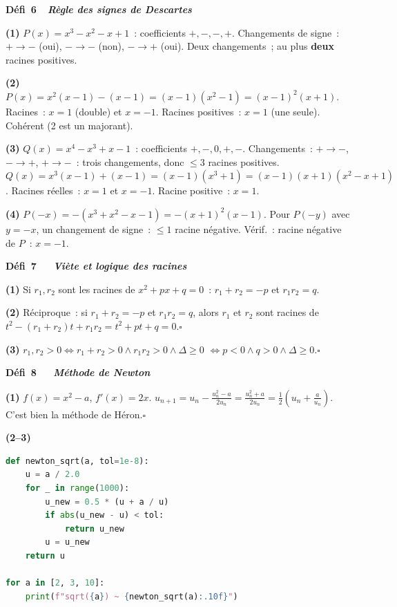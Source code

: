 \noindent{}
{\color{BO}\bfseries\small D\'efi~6~\textendash\ \textit{R\`egle des signes de Descartes}}
\par\smallskip

\textbf{(1)} $P(x)=x^3-x^2-x+1$~: coefficients $+,-,-,+$.
Changements de signe~: $+\to-$ (oui), $-\to-$ (non), $-\to+$ (oui).
Deux changements~; au plus \textbf{deux} racines positives.

\textbf{(2)} $P(x)=x^2(x-1)-(x-1)=(x-1)(x^2-1)=(x-1)^2(x+1)$.
Racines~: $x=1$ (double) et $x=-1$. Racines positives~: $x=1$ (une seule). Coh\'erent (2 est un majorant).\checkmark

\textbf{(3)} $Q(x)=x^4-x^3+x-1$~: coefficients $+,-,0,+,-$.
Changements~: $+\to-$, $-\to+$, $+\to-$~: trois changements, donc $\leq3$ racines positives.
$Q(x)=x^3(x-1)+(x-1)=(x-1)(x^3+1)=(x-1)(x+1)(x^2-x+1)$.
Racines r\'eelles~: $x=1$ et $x=-1$. Racine positive~: $x=1$.\checkmark

\textbf{(4)} $P(-x)=-(x^3+x^2-x-1)=-(x+1)^2(x-1)$.
Pour $P(-y)$ avec $y=-x$, un changement de signe~: $\leq1$ racine n\'egative.
V\'erif.~: racine n\'egative de $P$~: $x=-1$.\checkmark

\noindent{}
{\color{BO}\bfseries\small D\'efi~7~\textendash\ \textit{\logiq\ Vi\`ete et logique des racines}}
\par\smallskip

\textbf{(1)} Si $r_1,r_2$ sont les racines de $x^2+px+q=0$~:
$r_1+r_2=-p$ et $r_1r_2=q$.

\textbf{(2)} R\'eciproque~: si $r_1+r_2=-p$ et $r_1r_2=q$, alors
$r_1$ et $r_2$ sont racines de $t^2-(r_1+r_2)t+r_1r_2=t^2+pt+q=0$.\hfill$\square$

\textbf{(3)} $r_1,r_2>0\Leftrightarrow r_1+r_2>0\wedge r_1r_2>0\wedge\Delta\geq0$
$\Leftrightarrow p<0\wedge q>0\wedge\Delta\geq0$.\hfill$\square$

\noindent{}
{\color{BO}\bfseries\small D\'efi~8~\textendash\ \textit{\algo\ M\'ethode de Newton \computer}}
\par\smallskip

\textbf{(1)} $f(x)=x^2-a$, $f'(x)=2x$.
$u_{n+1}=u_n-\frac{u_n^2-a}{2u_n}=\frac{u_n^2+a}{2u_n}=\frac{1}{2}\!\left(u_n+\frac{a}{u_n}\right)$.
C'est bien la m\'ethode de H\'eron.\hfill$\square$

\textbf{(2--3)}
\begin{lstlisting}[language=Python]
def newton_sqrt(a, tol=1e-8):
    u = a / 2.0
    for _ in range(1000):
        u_new = 0.5 * (u + a / u)
        if abs(u_new - u) < tol:
            return u_new
        u = u_new
    return u

for a in [2, 3, 10]:
    print(f"sqrt({a}) ~ {newton_sqrt(a):.10f}")
\end{lstlisting}

